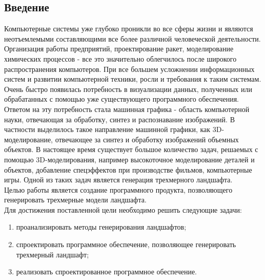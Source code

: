 \documentclass{article}
\begin{document}
	
	\newpage
	\tableofcontents
	\newpage
	\begin{center}
	    \section*{Введение}
	\end{center}
	\indent \indent Компьютерные системы уже глубоко проникли во все сферы жизни и являются неотъемлемыми составляющими все более различной человеческой деятельности. Организация работы предприятий, проектирование ракет, моделирование химических процессов - все это значительно облегчилось после широкого распространения компьютеров.
		\newline
	\indent При все большем усложнении информационных систем и развитии компьютерной техники, росли и требования к таким системам. Очень быстро появилась потребность в визуализации данных, полученных или обрабатанных с помощью уже существующего программного обеспечения. Ответом на эту потребность стала машинная графика - область компьютерной науки, отвечающая за обработку, синтез и распознавание изображений. В частности выделилось такое направление машинной графики, как 3D-моделирование, отвечающее за синтез и обработку изображений объемных объектов.
\newline
	\indent В настоящее время существует большое количество задач, решаемых с помощью 3D-моделирования, например высокоточное моделирование деталей и объектов, добавление спецэффектов при производстве фильмов, компьютерные игры. Одной из таких задач является генерация трехмерного ландшафта.
	\\ \indent
	Целью работы является создание программного продукта, позволяющего генерировать трехмерные модели ландшафта.
\\ \indent Для достижения поставленной цели необходимо решить следующие задачи:
	\begin{enumerate}
		\item проанализировать методы генерирования ландшафтов;
		\item спроектировать программное обеспечение, позволяющее генерировать трехмерный ландшафт;
		\item реализовать спроектированное программное обеспечение.
	\end{enumerate}

	\newpage
\end{document}
